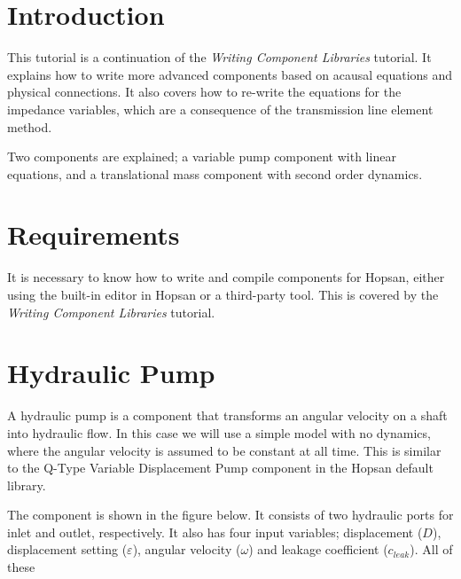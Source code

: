 \documentclass[a4paper,pdftex]{article}
\begin{document}

\section*{Introduction}
This tutorial is a continuation of the \textit{Writing Component Libraries} tutorial. It explains how to write more advanced components based on acausal equations and physical connections. It also covers how to re-write the equations for the impedance variables, which are a consequence of the transmission line element method.

Two components are explained; a variable pump component with linear equations, and a translational mass component with second order dynamics.

\section*{Requirements}
It is necessary to know how to write and compile components for Hopsan, either using the built-in editor in Hopsan or a third-party tool. This is covered by the \textit{Writing Component Libraries} tutorial.

\section*{Hydraulic Pump}
A hydraulic pump is a component that transforms an angular velocity on a shaft into hydraulic flow. In this case we will use a simple model with no dynamics, where the angular velocity is assumed to be constant at all time. This is similar to the Q-Type Variable Displacement Pump component in the Hopsan default library.

The component is shown in the figure below. It consists of two hydraulic ports for inlet and outlet, respectively. It also has four input variables; displacement ($D$), displacement setting ($\varepsilon$), angular velocity ($\omega$) and leakage coefficient ($c_{leak}$). All of these 

\end{document}
